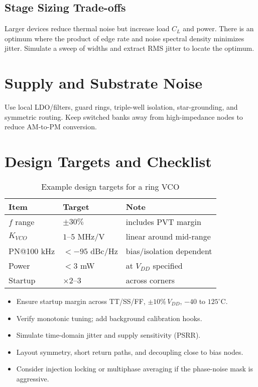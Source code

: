 \subsection*{Stage Sizing Trade-offs}
Larger devices reduce thermal noise but increase load \(C_L\) and power. There is an optimum where the product of edge rate and noise spectral density minimizes jitter. Simulate a sweep of widths and extract RMS jitter to locate the optimum.

\section{Supply and Substrate Noise}
Use local LDO/filters, guard rings, triple-well isolation, star-grounding, and symmetric routing. Keep switched banks away from high-impedance nodes to reduce AM-to-PM conversion.

\section{Design Targets and Checklist}
\begin{table}[H]
  \centering
  \begin{tabular}{lll}
    \toprule
    Item & Target & Note \\
    \midrule
    $f$ range & $\pm 30\%$ & includes PVT margin \\
    $K_{VCO}$ & $1$–$5$ MHz/V & linear around mid-range \\
    PN@100 kHz & $< -95$ dBc/Hz & bias/isolation dependent \\
    Power & $< 3$ mW & at $V_{DD}$ specified \\
    Startup & $\times 2$–$3$ & across corners \\
    \bottomrule
  \end{tabular}
  \caption{Example design targets for a ring VCO}
\end{table}

\begin{itemize}
  \item Ensure startup margin across TT/SS/FF, $\pm10\%\,V_{DD}$, $-40$ to $125^\circ$C.
  \item Verify monotonic tuning; add background calibration hooks.
  \item Simulate time-domain jitter and supply sensitivity (PSRR).
  \item Layout symmetry, short return paths, and decoupling close to bias nodes.
  \item Consider injection locking or multiphase averaging if the phase-noise mask is aggressive.
\end{itemize}

